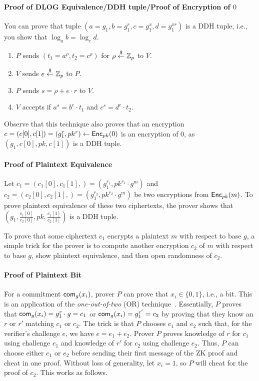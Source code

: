 \paragraph{Proof of DLOG Equivalence/DDH tuple/Proof of Encryption of $0$}
You can prove that tuple $(a=g_1,b=g_1^r,c=g_1^x,d=g_1^{xr})$ is a DDH
tuple, i.e., you show that $\log_{a}{b}=\log_c{d}$.

\begin{enumerate}
\item $P$ sends $(t_1=a^{\rho},t_2=c^{\rho})$ for $\rho\stackrel{\$}{\leftarrow}\mathbb{Z}_p$ to $V$.
  \item $V$ sends $e\stackrel{\$}{\leftarrow}\mathbb{Z}_p$ to $P$.
  \item $P$ sends $s=\rho+e\cdot{}r$ to $V$.
    \item $V$ accepts if $a^s=b^e\cdot{}t_1$ and $c^s=d^e\cdot{}t_2$.
\end{enumerate}

Observe that this technique also proves that an encryption
$c=(c[0],c[1])=(g_1^r,pk^r)\leftarrow{\mathsf{Enc}}_{pk}(0)$ is an encryption of
$0$, as $(g_1,c[0],pk,c[1])$ is a DDH tuple.

\paragraph{Proof of Plaintext Equivalence}
Let $c_1=(c_1[0],c_1[1],)=(g_1^{r_1},pk^{r_1}\cdot{}g^m)$ and
$c_2=(c_2[0],c_2[1],)=(g_1^{r_2},pk^{r_2}\cdot{}g^m)$ be two
encryptions from ${\mathsf{Enc}}_{pk}(m)$. To prove plaintext equivalence of
these two ciphertexts, the prover shows that
$(g_1,\frac{c_1[0]}{c_2[0]},pk,\frac{c_1[1]}{c_2[1]})$ is a DDH tuple.

To prove that some ciphertext $c_1$ encrypts a plaintext $m$ with
respect to base $g$, a simple trick for the prover is to compute
another encryption $c_2$ of $m$ with respect to base $g$, show
plaintext equivalence, and then open randomness of $c_2$.


\paragraph{Proof of Plaintext Bit}
For a commitment $\mathsf{com}_g(x_i)$, prover $P$ can prove that
$x_i\in\{0,1\}$, i.e., a bit. This is an application of the
\emph{one-out-of-two} (OR) technique~\cite{ooot}. Essentially, $P$
proves that $\mathsf{com}_g(x_i)=g_1^{r}\cdot{}g=c_1$ or
$\mathsf{com}_g(x_i)=g_1^{r'}=c_2$ by proving that they know an $r$ or $r'$
matching $c_1$ or $c_2$. The trick is that $P$ chooses $e_1$ and $e_2$
such that, for the verifier's challenge $e$, we have
$e=e_1+e_2$. Prover $P$ proves knowledge of $r$ for $c_1$ using
challenge $e_1$ and knowledge of $r'$ for $c_2$ using challenge
$e_2$. Thus, $P$ can choose either $e_1$ or $e_2$ before sending their
first message of the ZK proof and cheat in one proof. Without loss of
generality, let $x_i=1$, so $P$ will cheat for the proof of
$c_2$. This works as follows.


